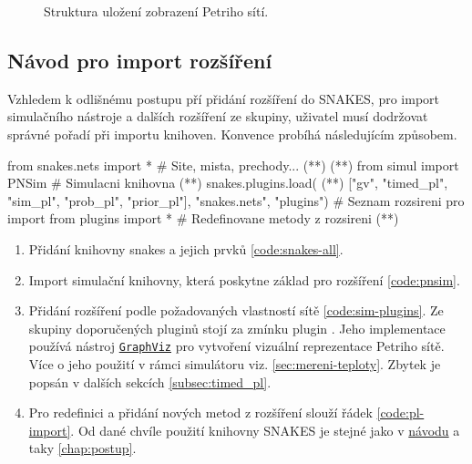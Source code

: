 \begin{figure}
  \centering
  \caption{Struktura uložení zobrazení Petriho sítí.}
  \label{fig:draw-stucture}
\end{figure}

\subsection{Návod pro import rozšíření}
Vzhledem k odlišnému postupu pří přidání rozšíření do SNAKES, pro import simulačního nástroje a dalších rozšíření ze skupiny, uživatel musí dodržovat správné pořadí při importu knihoven. Konvence probíhá následujícím způsobem.

\begin{python}
 from snakes.nets import *   # Site, mista, prechody... (*\label{code:snakes-all}*) (*\label{code:plugin-setup}*)
 from simul import PNSim     # Simulacni knihovna (*\label{code:pnsim}*)
 snakes.plugins.load( (*\label{code:sim-plugins}*)
   ["gv", "timed_pl", "sim_pl", "prob_pl", "prior_pl"],
   "snakes.nets",
   "plugins") # Seznam rozsireni pro import
 from plugins import * # Redefinovane metody z rozsireni (*\label{code:pl-import}*)
\end{python}

\begin{enumerate}
 \item Přidání knihovny snakes a jejich prvků \ref{code:snakes-all}.
 \item Import simulační knihovny, která poskytne základ pro rozšíření \ref{code:pnsim}.
 \item Přidání rozšíření podle požadovaných vlastností sítě \ref{code:sim-plugins}. Ze skupiny doporučených pluginů stojí za zmínku plugin \href{https://www.ibisc.univ-evry.fr/~fpommereau/SNAKES/API/plugins/gv.html}{}. Jeho implementace používá nástroj \href{https://www.graphviz.org/}{\texttt{GraphViz}} pro vytvoření vizuální reprezentace Petriho sítě. Více o jeho použití v rámci simulátoru viz. \ref{sec:mereni-teploty}. Zbytek je popsán v dalších sekcích \ref{subsec:timed_pl}.
 \item Pro redefinici a přidání nových metod z rozšíření slouží řádek \ref{code:pl-import}. Od dané chvíle použití knihovny SNAKES je stejné jako v \href{https://www.ibisc.univ-evry.fr/~fpommereau/SNAKES/first-steps-with-snakes.html}{návodu} a taky \ref{chap:postup}.
\end{enumerate}



